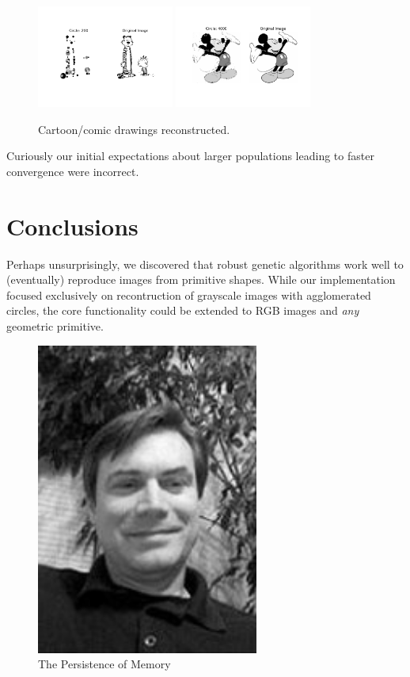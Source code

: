 \documentclass[12pt]{article}
\begin{document}
\begin{figure}[H]
\centering
\noindent\includegraphics[width=0.4\textwidth]{../results/cartoons/hobbes_0200}
\noindent\includegraphics[width=0.4\textwidth]{../results/mickey/mickey_4000}
\caption{Cartoon/comic drawings reconstructed. }
\label{fig:hobbes_0200}
\end{figure}
Curiously our initial expectations about larger populations leading to faster convergence were incorrect. 


\section*{Conclusions}
Perhaps unsurprisingly, we discovered that robust genetic algorithms work well to (eventually) reproduce images from primitive shapes. While our implementation focused exclusively on recontruction of grayscale images with agglomerated circles, the core functionality could be extended to RGB images and \textit{any} geometric primitive.
\begin{figure}[H]
\centering
\noindent\includegraphics[width=0.65\textwidth]{../images/jmcgough}
\caption{The Persistence of Memory}
\label{fig:jmcgough}
\end{figure}
\end{document}
